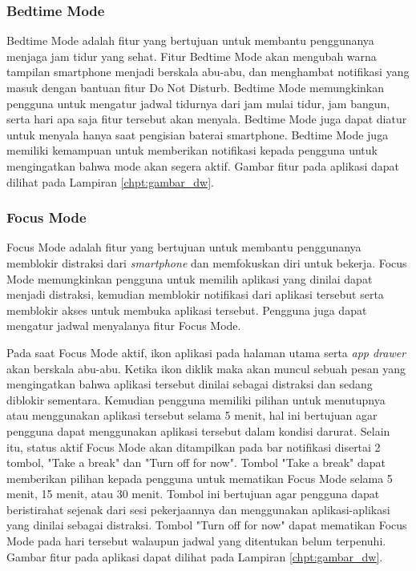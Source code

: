 \subsubsection{Bedtime Mode}
Bedtime Mode adalah fitur yang bertujuan untuk membantu penggunanya menjaga jam tidur yang sehat. Fitur Bedtime Mode akan mengubah warna tampilan smartphone menjadi berskala abu-abu, dan menghambat notifikasi yang masuk dengan bantuan fitur Do Not Disturb. Bedtime Mode memungkinkan pengguna untuk mengatur jadwal tidurnya dari jam mulai tidur, jam bangun, serta hari apa saja fitur tersebut akan menyala. Bedtime Mode juga dapat diatur untuk menyala hanya saat pengisian baterai smartphone. \parencite{android2019digitalwellbeing} Bedtime Mode juga memiliki kemampuan untuk memberikan notifikasi kepada pengguna untuk mengingatkan bahwa mode akan segera aktif. Gambar fitur pada aplikasi dapat dilihat pada Lampiran \ref{chpt:gambar_dw}.

\subsubsection{Focus Mode}
Focus Mode adalah fitur yang bertujuan untuk membantu penggunanya memblokir distraksi dari \textit{smartphone} dan memfokuskan diri untuk bekerja. Focus Mode memungkinkan pengguna untuk memilih aplikasi yang dinilai dapat menjadi distraksi, kemudian memblokir notifikasi dari aplikasi tersebut serta memblokir akses untuk membuka aplikasi tersebut. Pengguna juga dapat mengatur jadwal menyalanya fitur Focus Mode. \parencite{android2019digitalwellbeing}

Pada saat Focus Mode aktif, ikon aplikasi pada halaman utama serta \textit{app drawer} akan berskala abu-abu. Ketika ikon diklik maka akan muncul sebuah pesan yang mengingatkan bahwa aplikasi tersebut dinilai sebagai distraksi dan sedang diblokir sementara. Kemudian pengguna memiliki pilihan untuk menutupnya atau menggunakan aplikasi tersebut selama 5 menit, hal ini bertujuan agar pengguna dapat menggunakan aplikasi tersebut dalam kondisi darurat. Selain itu, status aktif Focus Mode akan ditampilkan pada bar notifikasi disertai 2 tombol, "Take a break" dan "Turn off for now". Tombol "Take a break" dapat memberikan pilihan kepada pengguna untuk mematikan Focus Mode selama 5 menit, 15 menit, atau 30 menit. Tombol ini bertujuan agar pengguna dapat beristirahat sejenak dari sesi pekerjaannya dan menggunakan aplikasi-aplikasi yang dinilai sebagai distraksi. Tombol "Turn off for now" dapat mematikan Focus Mode pada hari tersebut walaupun jadwal yang ditentukan belum terpenuhi. Gambar fitur pada aplikasi dapat dilihat pada Lampiran \ref{chpt:gambar_dw}.

